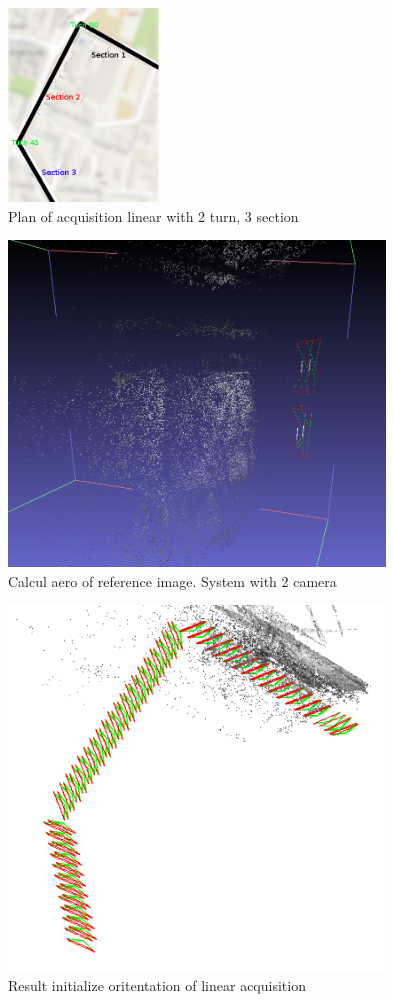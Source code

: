 \begin{figure}[H]
\centering
\includegraphics[width=4cm]{FIGS/InitOriLinear/planpartir_quartier.png}
\caption{Plan of acquisition linear with 2 turn, 3 section}
\label{SurfCorr}
\end{figure}
\begin{figure}[H]
\centering
\includegraphics[width=10cm]{FIGS/InitOriLinear/InitPose01.png}
\caption{Calcul aero of reference image. System with 2 camera}
\label{SurfCorr}
\end{figure}
\begin{figure}[H]
\centering
\includegraphics[width=10cm]{FIGS/InitOriLinear/InitAllImg2Turn00.png}
\caption{Result initialize oritentation of linear acquisition}
\label{SurfCorr}
\end{figure}
